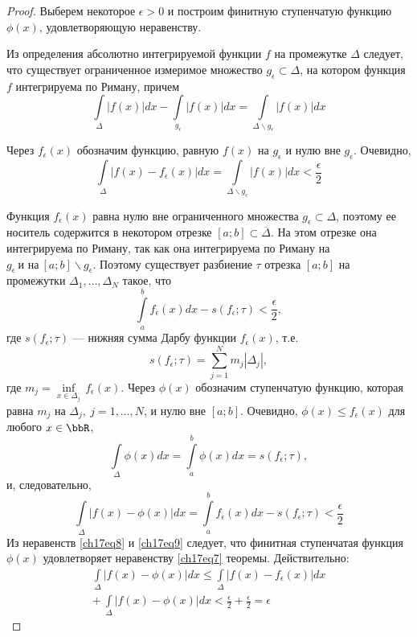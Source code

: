 \begin{proof}
Выберем некоторое $\epsilon > 0$ и построим финитную ступенчатую функцию $\phi(x)$, удовлетворяющую неравенству.

Из определения абсолютно интегрируемой функции $f$ на промежутке $\Delta$ следует, что существует ограниченное измеримое множество $g_{\epsilon} \subset \Delta$, на котором функция $f$ интегрируема по Риману, причем
$$
\int\limits_{\Delta} |f(x)|dx - \int\limits_{g_{\epsilon}} |f(x)|dx = \int\limits_{\Delta\backslash g_{\epsilon}} |f(x)|dx
$$

Через $f_{\epsilon}(x)$ обозначим функцию, равную $f(x)$ на $g_{\epsilon}$ и нулю вне $g_{\epsilon}$. Очевидно,
\begin{equation} \label{ch17eq8}
\int\limits_{\Delta} |f(x) - f_{\epsilon}(x)|dx = \int\limits_{\Delta\backslash g_{\epsilon}} |f(x)|dx < \frac{\epsilon}{2}
\end{equation}

Функция $f_{\epsilon}(x)$ равна нулю вне ограниченного множества $g_{\epsilon} \subset \Delta$, поэтому ее носитель содержится в некотором отрезке $[a;b] \subset \overline{\Delta}$. На этом отрезке она интегрируема по Риману, так как она интегрируема по Риману на $g_{\epsilon}\ \text{и на}\ [a;b]\backslash g_{\epsilon}$. Поэтому существует разбиение $\tau$ отрезка $[a;b]$ на промежутки $\Delta_1,\ldots,\Delta_N$ такое, что
$$
\int\limits_{a}^{b} f_{\epsilon}(x)dx - s(f_{\epsilon};\tau) < \frac{\epsilon}{2},
$$
где $s(f_{\epsilon};\tau)$ --- нижняя сумма Дарбу функции $f_{\epsilon}(x)$, т.е.
$$
s(f_{\epsilon};\tau) = \sum_{j = 1}^{N} m_{j}|\Delta_j|,
$$
где $m_j = \inf\limits_{x \in \Delta_j}\,f_{\epsilon}(x)$. Через $\phi(x)$ обозначим ступенчатую функцию, которая равна $m_j$ на $\Delta_j,\ j = 1,\ldots,N$, и нулю вне $[a;b]$. Очевидно, $\phi(x) \le f_{\epsilon}(x)$ для любого $x \in \bbR$,
$$
\int\limits_{\Delta} \phi(x)dx = \int\limits_{a}^{b} \phi(x)dx = s(f_{\epsilon};\tau),
$$
и, следовательно,
\begin{equation} \label{ch17eq9}
\int\limits_{\Delta} |f(x) - \phi(x)|dx = \int\limits_{a}^{b} f_{\epsilon}(x)dx - s(f_{\epsilon};\tau) < \frac{\epsilon}{2}
\end{equation}
Из неравенств \eqref{ch17eq8} и \eqref{ch17eq9} следует, что финитная ступенчатая функция $\phi(x)$ удовлетворяет неравенству \eqref{ch17eq7} теоремы. Действительно:
\begin{multline*}
\int\limits_{\Delta} |f(x) - \phi(x)|dx \le \int\limits_{\Delta} |f(x) - f_{\epsilon}(x)|dx\\
+\ \int\limits_{\Delta} |f(x) - \phi(x)|dx < \frac{\epsilon}{2} + \frac{\epsilon}{2} = \epsilon
\end{multline*}
\end{proof}

